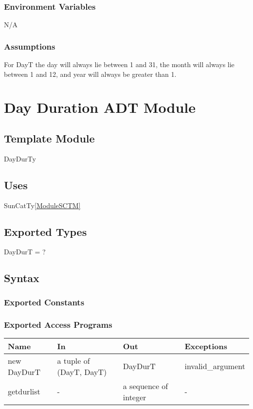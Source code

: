 \documentclass[12pt, titlepage]{article}
\begin{document}
\subsubsection{Environment Variables}

N/A\\

\subsubsection{Assumptions}
For DayT the day will always lie between 1 and 31, the month will always lie between 1 and 12, and year will always be greater than 1.

\section{Day Duration ADT Module} \label{ModuleADTD} 

\subsection{Template Module}
DayDurTy

\subsection{Uses}

SunCatTy\ref{ModuleSCTM} \\

\subsection{Exported Types}

DayDurT = ?\\

\subsection{Syntax}

\subsubsection{Exported Constants}


\subsubsection{Exported Access Programs}

\begin{center}
\begin{tabular}{p{3cm} p{5cm} p{4cm} p{2cm}}
\hline
\textbf{Name} & \textbf{In} & \textbf{Out} & \textbf{Exceptions} \\
\hline
new DayDurT& a tuple of (DayT, DayT)  & DayDurT & invalid\_argument \\
getdurlist &  -  & a sequence of integer & - \\

\hline
\end{tabular}
\end{center}
\end{document}
